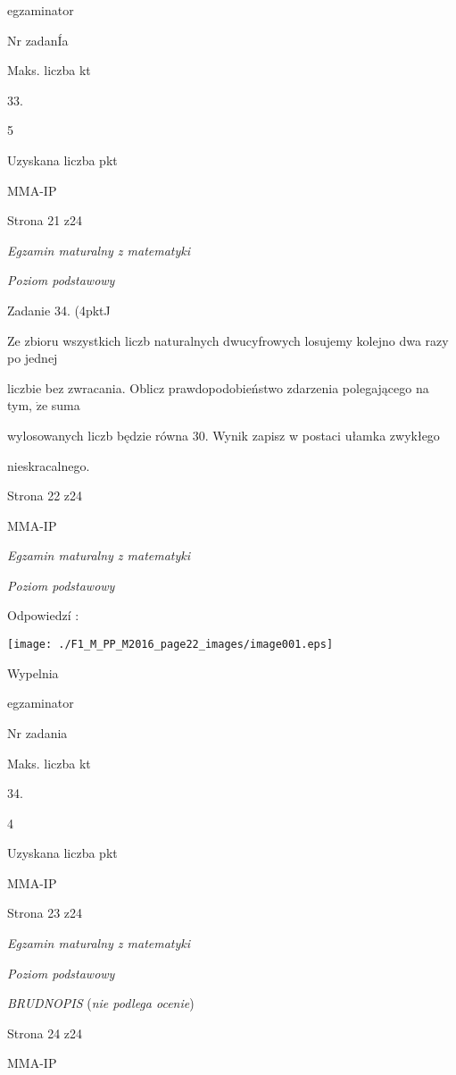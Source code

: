 \documentclass[a4paper,12pt]{article}
\begin{document}
egzaminator

Nr zadanÍa

Maks. liczba kt

33.

5

Uzyskana liczba pkt

MMA-IP

Strona 21 z24





{\it Egzamin maturalny z matematyki}

{\it Poziom podstawowy}

Zadanie 34. (4pktJ

Ze zbioru wszystkich liczb naturalnych dwucyfrowych losujemy kolejno dwa razy po jednej

liczbie bez zwracania. Oblicz prawdopodobieństwo zdarzenia polegającego na tym, $\dot{\mathrm{z}}\mathrm{e}$ suma

wylosowanych liczb będzie równa 30. Wynik zapisz w postaci ułamka zwykłego

nieskracalnego.

Strona 22 z24

MMA-IP





{\it Egzamin maturalny z matematyki}

{\it Poziom podstawowy}

Odpowiedzí :
\begin{center}
\texttt{[image: ./F1\_M\_PP\_M2016\_page22\_images/image001.eps]}
\end{center}
Wypelnia

egzaminator

Nr zadania

Maks. liczba kt

34.

4

Uzyskana liczba pkt

MMA-IP

Strona 23 z24





{\it Egzamin maturalny z matematyki}

{\it Poziom podstawowy}

{\it BRUDNOPIS} ({\it nie podlega ocenie})

Strona 24 z24

MMA-IP
\end{document}
